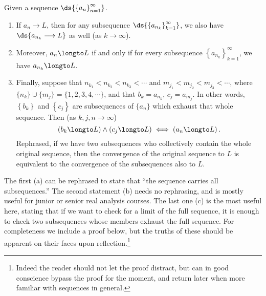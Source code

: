 \begin{theorem} Given a sequence $\ds{\left\{a_n\right\}_{n=1}^\infty}$.
\begin{enumerate}[\bf (a)]
\item If $a_n\longrightarrow L$, then for any subsequence 
$\ds{\left\{a_{n_k}\right\}_{k=1}^\infty}$, we also have
$\ds{a_{n_k}\longrightarrow L}$ as well (as $k\to\infty$).
\item  Moreover, $a_n\longto L$ if and only if for every
       subsequence $\left\{a_{n_k}\right\}_{k=1}^\infty$,
       we have $a_{n_k}\longto L$.
\item  Finally, suppose that $n_{k_1}<n_{k_2}<n_{k_3}<\cdots$ and
       $m_{j_1}<m_{j_2}<m_{j_3}<\cdots$, where
       $\{n_k\}\cup\{m_j\}=\{1,2,3,4,\cdots\}$,
       and that $b_k=a_{n_k}$, $c_j=a_{m_j}$.  In other 
       words, $\left\{b_k\right\}$ and $\left\{c_j\right\}$
       are subsequences of $\{a_n\}$ which exhaust that
       whole sequence.  Then (as $k,j,n\to\infty$)  
       $$\left(b_k\longto L\right)\wedge\left(c_j\longto L\right)
         \iff\left(a_n\longto L\right).$$
       Rephrased, if we have two subsequences who
       collectively contain the whole original sequence,
       then the convergence of the original sequence to $L$ is 
       equivalent to the convergence of the subsequences also to $L$.

\end{enumerate}\label{Sequences<=>Subsequences}
\end{theorem}
The first (a) can be rephrased to state that ``the sequence carries
all subsequences.''  The second statement (b) needs no rephrasing,
and is mostly useful for junior or senior real analysis courses.
The last one (c) is the most useful here, stating
that if we want to check for a limit
of the full sequence, it is enough to check two subsequences whose
members exhaust the full sequence.  For completeness
we include a proof below, but the truths of these should 
be apparent on their faces upon reflection.\footnote{
Indeed the reader
should not let the proof distract, but can in good conscience bypass
the proof for the moment, and return later when more familiar with
sequences in general.
}

